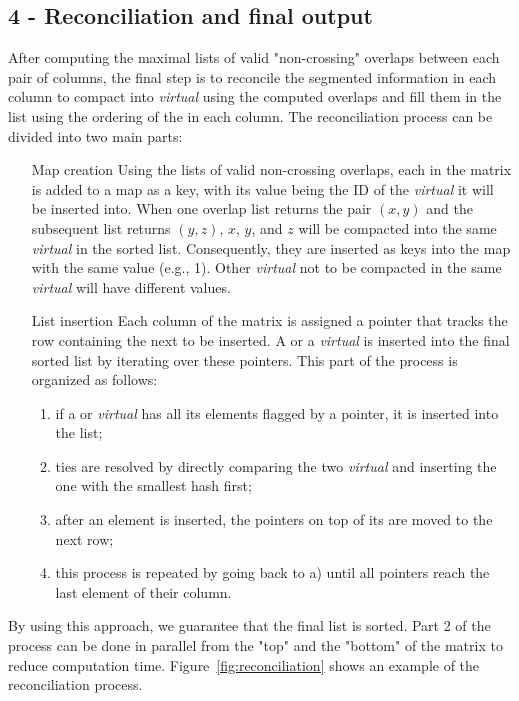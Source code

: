 \subsection{4 - Reconciliation and final output}
\label{sec:reconciliation}
After computing the maximal lists of valid "non-crossing" overlaps between each pair of columns, the final step is to reconcile the segmented information in each column to compact \kmers into \emph{virtual} \skmers using the computed overlaps and fill them in the list using the ordering of the \kmers in each column. The reconciliation process can be divided into two main parts:
\begin{enumerate}
	\item [Map creation] Using the lists of valid non-crossing overlaps, each \kmer in the matrix is added to a map as a key, with its value being the ID of the \emph{virtual} \skmer it will be inserted into. When one overlap list returns the pair $(x,y)$ and the subsequent list returns $(y,z)$, \kmers $x$, $y$, and $z$ will be compacted into the same \emph{virtual} \skmer in the sorted list. Consequently, they are inserted as keys into the map with the same value (e.g., 1). Other \emph{virtual} \skmers not to be compacted in the same \emph{virtual} \skmer will have different values.
	\item [List insertion] Each column of the matrix is assigned a pointer that tracks the row containing the next \kmer to be inserted. A \kmer or a \emph{virtual} \skmer is inserted into the final sorted list by iterating over these pointers. This part of the process is organized as follows:
	\begin{enumerate}
	\item if a \kmer or \emph{virtual} \skmer has all its elements flagged by a pointer, it is inserted into the list;
	\item ties are resolved by directly comparing the two \emph{virtual} \skmers and inserting the one with the smallest hash first;
	\item after an element is inserted, the pointers on top of its \kmers are moved to the next row;
	\item this process is repeated by going back to a) until all pointers reach the last element of their column.
	\end{enumerate}
\end{enumerate}
By using this approach, we guarantee that the final list is sorted. Part 2 of the process can be done in parallel from the "top" and the "bottom" of the matrix to reduce computation time. Figure~\ref{fig:reconciliation} shows an example of the reconciliation process.

